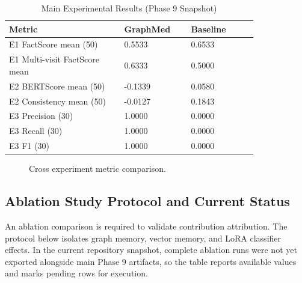 \documentclass[conference]{IEEEtran}
\begin{document}
\begin{table}[t]
\caption{Main Experimental Results (Phase 9 Snapshot)}
\label{tab:main_results}
\centering
\begin{tabular}{p{0.38\linewidth}p{0.22\linewidth}p{0.22\linewidth}}
\toprule
Metric & GraphMed & Baseline \\
\midrule
E1 FactScore mean (50) & 0.5533 & 0.6533 \\
E1 Multi-visit FactScore mean & 0.6333 & 0.5000 \\
E2 BERTScore mean (50) & -0.1339 & 0.0580 \\
E2 Consistency mean (50) & -0.0127 & 0.1843 \\
E3 Precision (30) & 1.0000 & 0.0000 \\
E3 Recall (30) & 1.0000 & 0.0000 \\
E3 F1 (30) & 1.0000 & 0.0000 \\
\bottomrule
\end{tabular}
\end{table}

\begin{figure}[t]
\centering
{}
\caption{Cross experiment metric comparison.}
\label{fig:bars}
\end{figure}

\subsection{Ablation Study Protocol and Current Status}
An ablation comparison is required to validate contribution attribution. The protocol below isolates graph memory, vector memory, and LoRA classifier effects. In the current repository snapshot, complete ablation runs were not yet exported alongside main Phase 9 artifacts, so the table reports available values and marks pending rows for execution.
\end{document}

